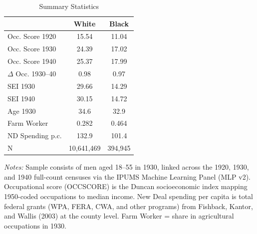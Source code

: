 \begin{table}[t]
\centering
\caption{Summary Statistics}
\label{tab:summary}
\begin{tabular}{lcc}
\toprule
 & White & Black \\
\midrule
Occ. Score 1920 & 15.54 & 11.04 \\
Occ. Score 1930 & 24.39 & 17.02 \\
Occ. Score 1940 & 25.37 & 17.99 \\
$\Delta$ Occ. 1930--40 & 0.98 & 0.97 \\
SEI 1930 & 29.66 & 14.29 \\
SEI 1940 & 30.15 & 14.72 \\
Age 1930 & 34.6 & 32.9 \\
Farm Worker & 0.282 & 0.464 \\
ND Spending p.c. & 132.9 & 101.4 \\
N & 10,641,469 & 394,945 \\
\bottomrule
\end{tabular}
\begin{tablenotes}
\item \textit{Notes:} Sample consists of men aged 18--55 in 1930, linked across the 1920, 1930, and 1940 full-count censuses via the IPUMS Machine Learning Panel (MLP v2). Occupational score (OCCSCORE) is the Duncan socioeconomic index mapping 1950-coded occupations to median income. New Deal spending per capita is total federal grants (WPA, FERA, CWA, and other programs) from Fishback, Kantor, and Wallis (2003) at the county level. Farm Worker = share in agricultural occupations in 1930.
\end{tablenotes}
\end{table}

